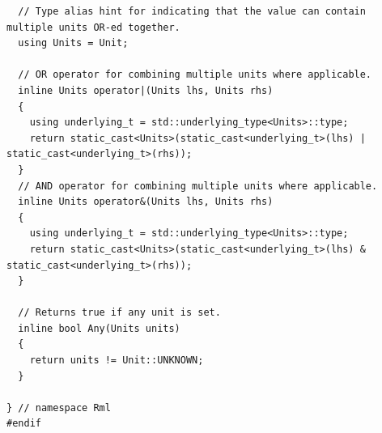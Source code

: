 \documentclass{article}
\begin{document}
\begin{verbatim}
  // Type alias hint for indicating that the value can contain multiple units OR-ed together.
  using Units = Unit;

  // OR operator for combining multiple units where applicable.
  inline Units operator|(Units lhs, Units rhs)
  {
    using underlying_t = std::underlying_type<Units>::type;
    return static_cast<Units>(static_cast<underlying_t>(lhs) | static_cast<underlying_t>(rhs));
  }
  // AND operator for combining multiple units where applicable.
  inline Units operator&(Units lhs, Units rhs)
  {
    using underlying_t = std::underlying_type<Units>::type;
    return static_cast<Units>(static_cast<underlying_t>(lhs) & static_cast<underlying_t>(rhs));
  }

  // Returns true if any unit is set.
  inline bool Any(Units units)
  {
    return units != Unit::UNKNOWN;
  }

} // namespace Rml
#endif

  \end{verbatim}
\end{document}

